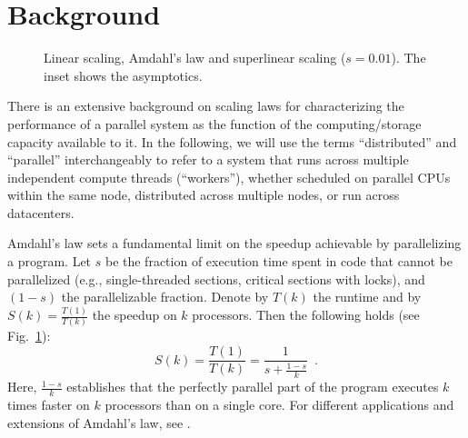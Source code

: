 \section{Background}\label{sec:background}

\begin{figure}[t]
  \centering
  \begin{small}
    
  \end{small}
  \caption{Linear scaling, Amdahl's law and superlinear scaling ($s=0.01$). The inset shows the asymptotics.}
    \label{fig:amdahl}
\end{figure}

There is an extensive background on scaling laws for characterizing the performance of a parallel system as the function of the computing\slash storage capacity available to it. In the following, we will use the terms ``distributed'' and ``parallel'' interchangeably to refer to a system that runs across multiple independent compute threads (“workers”), whether scheduled on parallel CPUs within the same node, distributed across multiple nodes, or run across datacenters.

Amdahl's law \cite{10.1145/1465482.1465560} sets a fundamental limit on the speedup achievable by parallelizing a program.  Let $s$ be the fraction of execution time spent in code that cannot be parallelized (e.g., single-threaded sections, critical sections with locks), and $(1-s)$ the parallelizable fraction.  Denote by $T(k)$ the runtime and by $S(k)=\frac{T(1)}{T(k)}$ the speedup on $k$ processors. Then the following holds (see Fig.~\ref{fig:amdahl}):
\begin{equation}\label{eq:amdahl}
S(k) = \frac{T(1)}{T(k)} = \frac{1}{s + \frac{1-s}{k}} \enspace .
\end{equation}
Here, $\frac{1-s}{k}$ establishes that the perfectly parallel part of the program executes $k$ times faster on $k$ processors than on a single core. For different applications and extensions of Amdahl's law, see \cite{4563876, 6280307, 1580395, 406581, 6163449, gunther2008generaltheorycomputationalscalability, 10.5555/1951599}.

